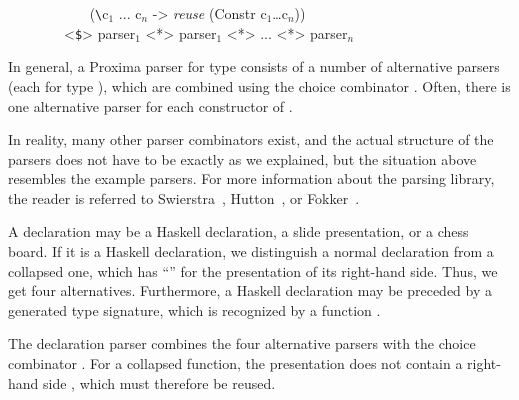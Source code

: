 \ttfamily\begin{small}\begin{tabbing}
~~~~~~~~~~~ (\verb|\|c$_1$ ... c$_{n}$ -> {\em reuse} (Constr c$_1$\dots c$_{n}$))\\
~~~~~~~~<\verb|$|> parser$_{1}$ <*> parser$_{1}$ <*> ... <*> parser$_{n}$ \\
\end{tabbing}\end{small}\rmfamily

In general, a Proxima parser for type  consists of a number of alternative parsers (each for type ), which are combined using the choice combinator \p{<|>}. Often, there is one alternative parser for each constructor of . 

In reality, many other parser combinators exist, and the actual structure of the parsers does not have to be exactly as we explained, but the situation above resembles the example parsers. For more information about the parsing library, the reader is referred to Swierstra~\cite{swierstra01parsers}, Hutton~\cite{hutton92parsers}, or Fokker~\cite{ fokker95parsers}.





A declaration may be a Haskell declaration, a slide presentation, or a chess board. If it is a Haskell declaration, we distinguish a normal declaration from a collapsed one, which has ``'' for the presentation of its right-hand side. Thus, we get four alternatives. Furthermore, a Haskell declaration may be preceded by a generated type signature, which is recognized by a function .

The declaration parser combines the four alternative parsers with the choice combinator \p{<|>}. For a collapsed function, the presentation does not contain a right-hand side , which must therefore be reused. 

